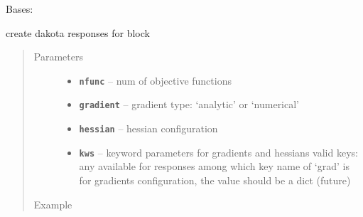 \documentclass[letterpaper,10pt,english]{sphinxmanual}
\begin{document}

\begin{fulllineitems}
\label{src/apidocs/genopt:genopt.DakotaResponses}
Bases: \href{https://docs.python.org/2/library/functions.html\#object}{}

create dakota responses for  block
\begin{quote}\begin{description}
\item[{Parameters}] \leavevmode\begin{itemize}
\item {} 
\textbf{\texttt{nfunc}} -- num of objective functions

\item {} 
\textbf{\texttt{gradient}} -- gradient type: `analytic' or `numerical'

\item {} 
\textbf{\texttt{hessian}} -- hessian configuration

\item {} 
\textbf{\texttt{kws}} -- keyword parameters for gradients and hessians
valid keys: any available for responses
among which key name of `grad' is for gradients configuration, 
the value should be a dict (future)

\end{itemize}

\item[{Example}] \leavevmode
\end{description}\end{quote}


\end{fulllineitems}
\end{document}
